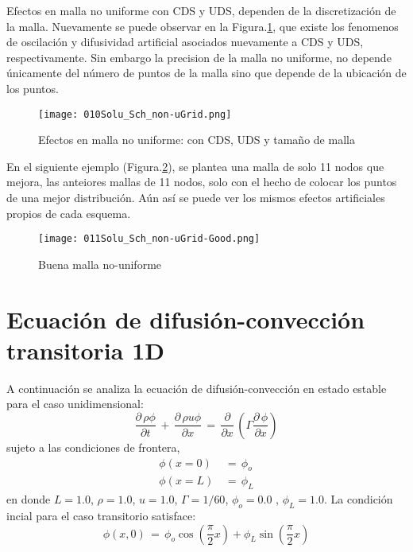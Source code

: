 \documentclass[9pt,technote,twoside,letterpaper,onecolumn]{IEEEtran}
\begin{document}
\begin{multicols}{2}
Efectos en malla no uniforme con CDS y UDS, dependen de la discretización de la malla. Nuevamente se puede observar en la Figura.\ref{fig:sch_n-ugrid}, que existe los fenomenos de oscilación y difusividad artificial asociados nuevamente a CDS y UDS, respectivamente. Sin embargo la precision de la malla no uniforme, no depende únicamente del número de puntos de la malla sino que depende de la ubicación de los puntos.
\begin{figure}[H]
  \centering
  \texttt{[image: 010Solu\_Sch\_non-uGrid.png]}\\
  \label{fig:sch_n-ugrid}
  \caption{Efectos en malla no uniforme: con CDS, UDS y tamaño de malla}
\end{figure}

En el siguiente ejemplo (Figura.\ref{fig:sch_n-ugrid-good}), se plantea una malla de solo 11 nodos que mejora, las anteiores mallas de 11 nodos, solo con el hecho de colocar los puntos de una mejor distribución. Aún así se puede ver los mismos efectos artificiales propios de cada esquema.
\begin{figure}[H]
  \centering
  \texttt{[image: 011Solu\_Sch\_non-uGrid-Good.png]}\\
  \label{fig:sch_n-ugrid-good}
  \caption{Buena malla no-uniforme}
\end{figure}

\section{Ecuación de difusión-convección transitoria 1D}
\label{sec:dif-conv-trans}
A continuación se analiza la ecuación de difusión-convección en estado estable para el caso unidimensional:
\begin{equation}
  \frac{\partial\,\rho\phi}{\partial t}\,+\,\frac{\partial\,\rho u \phi}{\partial x}\,=\,\frac{\partial}{\partial x}\,\left(\Gamma\frac{\partial\,\phi}{\partial x}\right)
  \label{eq:dif-conv-trans}
\end{equation}
sujeto a las condiciones de frontera,
\begin{align}
  \phi(x=0)\,&=\,\phi_o\\
  \phi(x=L)\,&=\,\phi_L
\end{align}
en donde $L=1.0$, $\rho=1.0$, $u=1.0$, $\Gamma=1/60$, $\phi_o=0.0$ , $\phi_L=1.0$. La condición incial para el caso transitorio satisface:
\begin{equation}
  \phi(x,0)\,=\,\phi_o\cos(\frac{\pi}{2}x)+\phi_L\sin(\frac{\pi}{2}x)
  \label{eq:dif-conv-trans-ci}
\end{equation}


\end{multicols}
\end{document}
